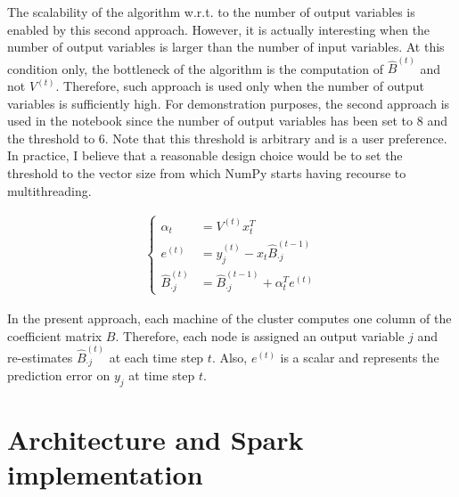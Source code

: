 The scalability of the algorithm w.r.t. to the number of output variables
is enabled by this second approach. However, it is actually interesting
when the number of output variables is larger than the number of input
variables. At this condition only, the bottleneck of the algorithm
is the computation of $\hat{B}^{(t)}$ and not $V^{(t)}$.
Therefore, such approach is used only when the number of output variables
is sufficiently high. For demonstration purposes, the second approach
is used in the notebook since the number of output variables has been
set to $8$ and the threshold to $6$. Note that this threshold is arbitrary
and is a user preference. In practice, I believe that a reasonable design choice
would be to set the threshold to the vector size from which NumPy starts having
recourse to multithreading.

\begin{align}
\begin{cases}
    \alpha_t & = V^{(t)} x_t^T \\
    e^{(t)} & = y_j^{(t)} - x_t \hat{B}_{\cdot j}^{(t-1)} \\
    \hat{B}_{\cdot j}^{(t)} & = \hat{B}_{\cdot j}^{(t-1)} + \alpha_t^T e^{(t)}
\end{cases}
\end{align}

In the present approach, each machine of the cluster computes one column
of the coefficient matrix $B$. Therefore, each node is assigned an output
variable $j$ and re-estimates $\hat{B}_{\cdot j}^{(t)}$ at each time step $t$.
Also, $e^{(t)}$ is a scalar and represents the prediction error on $y_j$ at time step $t$.


\section{Architecture and Spark implementation}


